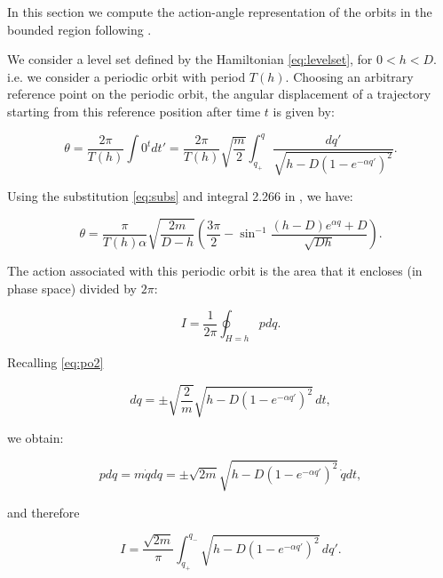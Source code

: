 \documentclass{ws-ijbc}
\begin{document}
In this section we compute the action-angle representation of the orbits in the bounded region following \cite{melnikov1963vk, wiggins1990introduction, mezic1994integrability}.

We consider a level set defined by the Hamiltonian \eqref{eq:levelset}, for $0 < h < D$. i.e. we consider a periodic orbit with period $T(h)$. Choosing an arbitrary reference point on the periodic orbit, the angular displacement of a trajectory starting from this reference position after time $t$ is given by:


\begin{equation}
\theta = \frac{2 \pi}{T(h)} \int{0}^{t}dt' = \frac{2 \pi}{T(h)}  \sqrt{\frac{m}{2}} \int_{q_+}^q \frac{dq'}{ \sqrt{h-D \left( 1-e^{-\alpha q'} \right)^2}}.
\label{eq:angle1}
\end{equation}

Using the substitution \eqref{eq:subs} and integral 2.266 in \cite{gradshteyn1980table}, we have:

\begin{equation}
\theta = \frac{\pi}{T(h)\alpha} \sqrt{\frac{2m}{D-h}} \left(\frac{3\pi}{2} - \sin^{-1}\frac{(h-D)e^{\alpha q}+D}{\sqrt{Dh}} \right).
\label{eq:angle2}
\end{equation}

\noindent
The action associated with this periodic orbit is the area that it encloses (in phase space) divided by $2 \pi$:

\begin{equation}
I = \frac{1}{2 \pi} \oint_{H=h}  p dq.
\label{eq:action1}
\end{equation}

\noindent
Recalling \eqref{eq:po2}

\begin{equation}
dq = \pm \sqrt{\frac{2}{m}}\sqrt{h-D \left( 1-e^{-\alpha q'} \right)^2} \, dt,
\label{eq:action2}
\end{equation}

\noindent
we obtain:

\begin{equation}
pdq = m \dot{q} dq = \pm \sqrt{2m}\sqrt{h-D \left( 1-e^{-\alpha q'} \right)^2} \, \dot{q}dt,
\label{eq:action3}
\end{equation}

\noindent
and therefore

\begin{equation}
I = \frac{\sqrt{2m}}{\pi} \int_{q_+}^{q_-}\sqrt{h-D \left( 1-e^{-\alpha q'} \right)^2} \, dq'.
\label{eq:action4}
\end{equation}
\end{document}
